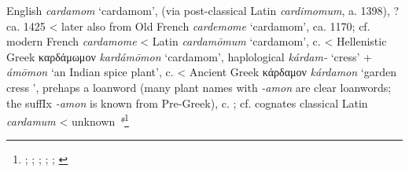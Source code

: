 \begin{etymology}\label{ety:cardamom}
English \textit{cardamom} `cardamom', (via post-classical Latin \textit{cardimomum}, a. 1398), ?ca. 1425
< later also from Old French \textit{cardemome} `cardamom', ca. 1170; cf. modern French \textit{cardamome}
< Latin \textit{cardamōmum} `cardamom',  c. \AD{}
< Hellenistic Greek {καρδάμωμον} \textit{kardámōmon} `cardamom', haplological  \textit{kárdam-} `cress' +  \textit{ámōmon} `an Indian spice plant',  c. \BC{}
< Ancient Greek {κάρδαμον} \textit{kárdamon} `garden cress ', prehaps a loanword (many plant names with \textit{-amon} are clear loanwords; the suffIx \textit{-amon} is known from Pre-Greek),  c. \BC{}; cf. cognates classical Latin \textit{cardamum}
< unknown \textit{*}\footnote{\textcite[s.v. cardamom]{oed}; \textcite[s.v. cardamome]{tlfi}; \textcite[s.v. cardamomum]{lewis_latin_1879}; \textcite[s.v. καρδάμωμον]{liddell_greek-english_1940}; \textcite[s.v. κάρδαμον]{liddell_greek-english_1940}; \textcite[644]{beekes_etymological_2010}}
\end{etymology}